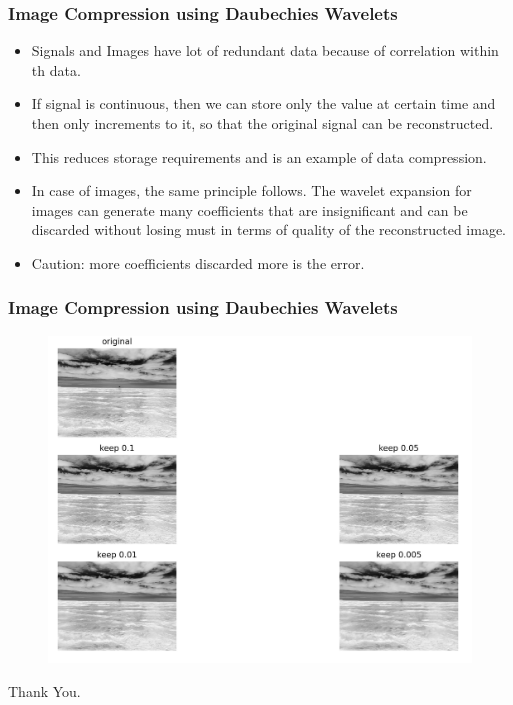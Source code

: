 \documentclass{beamer}
\begin{document}
\begin{frame}
\frametitle{Image Compression using Daubechies Wavelets}

\begin{itemize}
    \item Signals and Images have lot of redundant data because of correlation within th data.
    \item If signal is continuous, then we can store only the value at certain time and then only increments to it, so that the original signal can be reconstructed.
    \item This reduces storage requirements and is an example of data compression.
    \item In case of images, the same principle follows. The wavelet expansion for images can generate many coefficients that are insignificant and can be discarded without losing must in terms of quality of the reconstructed image.
    \item Caution: more coefficients discarded more is the error.
\end{itemize}
\end{frame}


\begin{frame}
    \frametitle{Image Compression using Daubechies Wavelets}
    \begin{figure}
        \includegraphics[width=0.8\linewidth]{image.jpg}
    \end{figure}
    \end{frame}
    


\begin{frame}
\Huge{\centerline{Thank You.}}
\end{frame}

\end{document}
